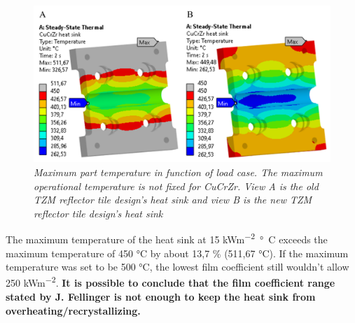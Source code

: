 \begin{figure}[h!]
    \label{fig_5_8} 
    \centering
    \includegraphics[width=1\textwidth]{figures/filmcoefficient15and30TEMPERATREFRINGEHS.png}
    \caption{\it Maximum part temperature in function of load case. The maximum operational temperature is not fixed for \acrshort{CuCrZr}. View A is the old \acrshort{TZM} reflector tile design's heat sink and view B is the new \acrshort{TZM} reflector tile design's heat sink}
\end{figure}

\normalsize{\indent The maximum temperature of the heat sink at 15 \unit{kWm^{-2}\si{\degree}C} exceeds the maximum temperature of 450 \unit{\si{\degree}}C \cite{Fellinger_2013} \cite{zhu_parametric_2019} by about 13,7 \% (511,67 \unit{\si{\degree}}C). If the maximum temperature was set to be 500 \unit{\si{\degree}}C, the lowest film coefficient still wouldn't allow 250 \unit{kWm^{-2}}. {\bfseries It is possible to conclude that the film coefficient range stated by J. Fellinger is not enough to keep the heat sink from overheating/recrystallizing.}}
